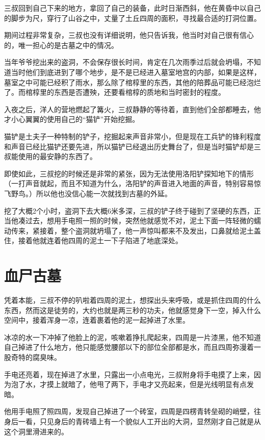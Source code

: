 三叔回到自己下来的地方，拿回了自己的装备，此时日渐西斜，他在黄昏中以自己的脚步为尺，穿行了山谷之中，丈量了土丘四周的面积，寻找最合适的打洞位置。

期间过程非常复杂，三叔也没有详细说明，他只告诉我，他当时对自己很有信心的，唯一担心的是古墓之中的情况。

当年爷爷挖出来的盗洞，不会保存很长时间，肯定在几次雨季过后就会坍塌，不知道当时他们到底进到了哪个地步，是不是已经进入墓室地宫的内部，如果是这样，墓室之中可能已经积了雨水，那么除了棺椁里的东西，其他的陪葬品可能已经泡烂了。而棺椁里的东西是否遭殃，还要看棺椁的质地和当时密封的程度。

入夜之后，洋人的营地燃起了篝火，三叔静静的等待着，直到他们全部都睡去，他才小心翼翼的使用自己的“猫铲”开始挖掘。

猫铲是土夫子一种特制的铲子，挖掘起来声音非常小，但是现在工兵铲的锋利程度和声音已经比猫铲还要先进，所以猫铲已经退出历史舞台了，但是当时猫铲却是三叔能使用的最安静的东西了。

即使如此，三叔挖的时候还是非常的紧张，因为无法使用洛阳铲探知地下的情形（一打声音就起，而且不知道为什么，洛阳铲的声音进入地面的声音，特别容易惊飞野鸟。）所以他也没信心能一次就找到古墓的外延。

挖了大概2个小时，盗洞下去大概6米多深，三叔的铲子终于碰到了坚硬的东西，正当他凑过去，想用手电照一照的时候，突然他就感觉不对，泥土下面一阵轻微的蠕动传来，紧接着，整个盗洞就坍塌了，他一声惊叫都来不及发出，口鼻就给泥土盖住，接着他就连着他四周的泥土一下子陷进了地底深处。

\chapter{血尸古墓}

凭着本能，三叔不停的叭啦着四周的泥土，想探出头来呼吸，或是抓住四周的什么东西，然而这是徒劳的，大约也就是两三秒的功夫，他就感觉身下一空，掉入什么空间中，接着浑身一凉，连着裹着他的泥一起掉进了水里。

冰凉的水一下冲掉了他脸上的泥，咳嗽着挣扎爬起来，四周是一片漆黑，他不知道自己掉进了什么地方，他只能感觉腰部以下的部位全部都是水，而且四周弥漫着一股奇特的腐臭味。

手电还亮着，现在掉进了水里，只露出一小点电光，三叔附身将手电摸了上来，因为泡了水，才摸上就暗了，他甩了两下，手电才又亮起来，但是光线明显有点发暗。

他用手电照了照四周，发现自己掉进了一个砖室，四周是四楞青转垒砌的峭壁，往身后一看，只见身后的青砖墙上有一个貌似人工开出的大洞，显然刚才自己就是从这个洞里滑进来的。

